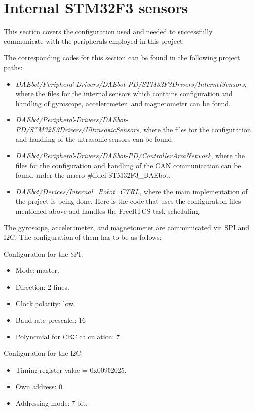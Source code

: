 \documentclass[12pt]{report}%
\begin{document}
\section{Internal STM32F3 sensors}
This section covers the configuration used and needed to successfully communicate with the peripherals employed in this project.

The corresponding codes for this section can be found in the following project paths:
\begin{itemize}
\item \textit{DAEbot/Peripheral-Drivers/DAEbot-PD/STM32F3Drivers/InternalSensors}, where the files for the internal sensors which contains configuration and handling of gyroscope, accelerometer, and magnetometer can be found.
\item \textit{DAEbot/Peripheral-Drivers/DAEbot-PD/STM32F3Drivers/UltrasonicSensors}, where the files for the configuration and handling of the ultrasonic sensors can be found.
\item \textit{DAEbot/Peripheral-Drivers/DAEbot-PD/ControllerAreaNetwork}, where the files for the configuration and handling of the CAN communication can be found under the macro \#ifdef STM32F3\_DAEbot.
\item \textit{DAEbot/Devices/Internal\_Robot\_CTRL}, where the main implementation of the project is being done. Here is the code that uses the configuration files mentioned above and handles the FreeRTOS task scheduling.
\end{itemize}

The gyroscope, accelerometer, and magnetometer are communicated via SPI and I2C. The configuration of them has to be as follows:

Configuration for the SPI:
\begin{itemize}
\item Mode: master.
\item Direction: 2 lines.
\item Clock polarity: low.
\item Baud rate prescaler: 16
\item Polynomial for CRC calculation: 7
\end{itemize}

Configuration for the I2C:
\begin{itemize}
\item Timing register value = 0x00902025.
\item Own address: 0.
\item Addressing mode: 7 bit.
\end{itemize}
\end{document}
